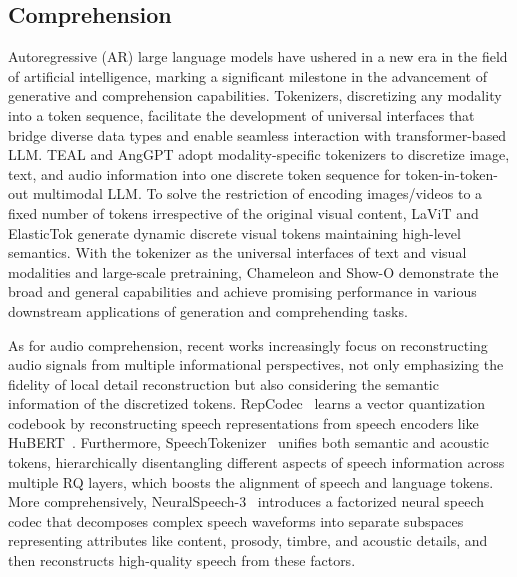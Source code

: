 \subsection{Comprehension}

Autoregressive (AR) large language models have ushered in a new era in the field of artificial intelligence, marking a significant milestone in the advancement of generative and comprehension capabilities. Tokenizers, discretizing any modality into a token sequence, facilitate the development of universal interfaces that bridge diverse data types and enable seamless interaction with transformer-based LLM.
TEAL \cite{yang2023teal} and AngGPT \cite{zhan2024anygpt} adopt modality-specific tokenizers to discretize image, text, and audio information into one discrete token sequence for token-in-token-out multimodal LLM.
To solve the restriction of encoding images/videos to a fixed number of tokens irrespective of the original visual content, 
LaViT \cite{jin2024lavit} and ElasticTok \cite{yan2024elastictok} generate dynamic discrete visual tokens maintaining high-level semantics. 
With the tokenizer as the universal interfaces of text and visual modalities and large-scale pretraining, Chameleon \cite{team2024chameleon} and Show-O \cite{xie2024show} demonstrate the broad and general capabilities and achieve promising performance in various downstream applications of generation and comprehending tasks.




As for audio comprehension, recent works increasingly focus on reconstructing audio signals from multiple informational perspectives, not only emphasizing the fidelity of local detail reconstruction but also considering the semantic information of the discretized tokens.
RepCodec~\cite{huang2023repcodec} learns a vector quantization codebook by reconstructing speech representations from speech encoders like HuBERT~\cite{hsu2021hubert}.
Furthermore, SpeechTokenizer~\cite{zhang2023speechtokenizer} unifies both semantic and acoustic tokens, hierarchically disentangling different aspects of speech information across multiple RQ layers, which boosts the alignment of speech and language tokens.
More comprehensively, NeuralSpeech-3~\cite{ju2024naturalspeech} introduces a factorized neural speech codec that decomposes complex speech waveforms into separate subspaces representing attributes like content, prosody, timbre, and acoustic details, and then reconstructs high-quality speech from these factors.



